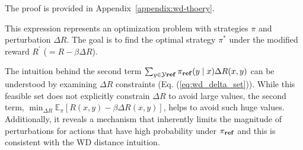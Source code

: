 The proof is provided in Appendix~\ref{appendix:wd-thoery}.


This expression represents an optimization problem with strategies $\pi$ and perturbation $\Delta R$. The goal is to find the optimal strategy $\pi^*$ under the modified reward $R^\prime$ ($= R-\beta \Delta R$). 


The intuition behind the second term $\sum_{y \in \mathcal{Y}{\textnormal{\textbf{ref}}}} \pi_{\textnormal{\textbf{ref}}}(y \mid x)\Delta R(x,y)$ can be understood by examining $\Delta R$ constraints (Eq. (\ref{eq:wd_delta_set})). 
While this feasible set does not explicitly constrain \(\Delta R\) to avoid large values, the second term, \(\min_{\Delta R} \mathbb{E}_{\pi}[R(x,y)-\beta \Delta R(x,y)]\), helps to avoid such huge values. Additionally, it reveals a mechanism that inherently limits the magnitude of perturbations for actions that have high probability under $\pi_{\textnormal{\textbf{ref}}}$ and this is consistent with the WD distance intuition.

